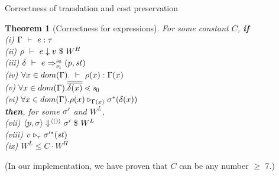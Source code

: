 \documentclass{beamer}
\newtheorem{thm}{Theorem}
\newtheorem{lem}[thm]{Lemma}
\begin{document}
\begin{frame}{Correctness of translation and cost preservation }
%		
%		

\begin{thm}[Correctness for expressions]
	For some constant $C$, \textbf{if} \\
    (i) $\Gamma \ \vdash\  e : \tau$ \\
    (ii) $\rho \ \vdash\  e \downarrow v \ \$ \ W^H$ \\ 
	(iii) $\delta \ \vdash\  e \Rightarrow^{\mathit{s}_0}_{\mathit{s}_1} (p,\mathit{st})$ \\ 
	(iv) $\forall x \in dom(\Gamma). \ \vdash\  \rho(x) : \Gamma(x)$ \\ 
	(v) $\forall x \in dom(\Gam). \olol{\del(x)} \.< \s_0$ \\
	(vi) $\forall x \in dom(\Gamma).  \rho(x) \mathrel{\triangleright_{\Gamma(x)}} \sigma^*(\delta(x))$ \\
	\textbf{then}, for some $\sigma'$ and $W^L$, \\
	(vii) $\left\langle p,\sigma \right\rangle \Downarrow^{\langle () \rangle} \sigma' \ \$ \ W^L$ \\
    (viii)  $v \mathrel{\triangleright_{\tau}} \sigma'^*(\mathit{st})$ \\
	(ix) $W^L \le C \cdot W^H$  \\
	\end{thm}
   (In our implementation, we have proven that $C$ can be any number $\ge$ 7.)
\end{frame}
\end{document}
